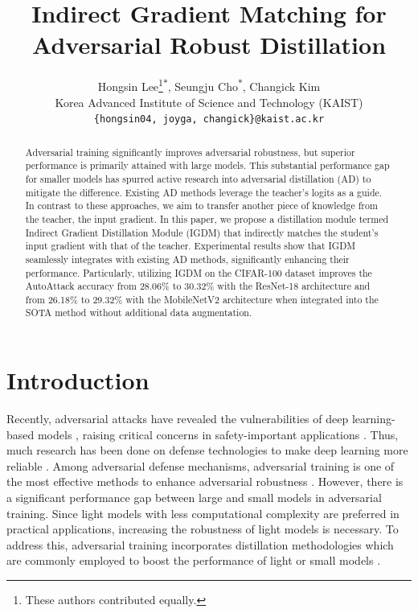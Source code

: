\documentclass{article} %
\title{Indirect Gradient Matching for Adversarial Robust Distillation}
\author{
Hongsin Lee\thanks{These authors contributed equally.}\textsuperscript{$*$}, 
Seungju Cho\footnotemark[1]\textsuperscript{$*$}, 
Changick Kim \\
Korea Advanced Institute of Science and Technology (KAIST)\\
{\normalsize \texttt{\{hongsin04, joyga, changick\}@kaist.ac.kr}} \\ 
}
\begin{document}
\maketitle

\begin{abstract}
Adversarial training significantly improves adversarial robustness, but superior performance is primarily attained with large models. 
This substantial performance gap for smaller models has spurred active research into adversarial distillation (AD) to mitigate the difference. 
Existing AD methods leverage the teacher’s logits as a guide.
In contrast to these approaches, we aim to transfer another piece of knowledge from the teacher, the input gradient.
In this paper, we propose a distillation module termed Indirect Gradient Distillation Module (IGDM) that indirectly matches the student’s input gradient with that of the teacher.
Experimental results show that IGDM seamlessly integrates with existing AD methods, significantly enhancing their performance.
Particularly, utilizing IGDM on the CIFAR-100 dataset improves the AutoAttack accuracy from 28.06\% to 30.32\% with the ResNet-18 architecture and from 26.18\% to 29.32\% with the MobileNetV2 architecture when integrated into the SOTA method without additional data augmentation.
\end{abstract}

\section{Introduction}
\label{sec:intro}

Recently, adversarial attacks have revealed the vulnerabilities of deep learning-based models \citep{FGSM, CW_attack, PGD}, raising critical concerns in safety-important applications \citep{safe2, safe1,wang2023does}.
Thus, much research has been done on defense technologies to make deep learning more reliable \citep{2017_jpeg_defense, carmon2019unlabeled, cohen2019certified, xie2019feature, zhang2022adversarial, jin2023randomized}.
Among adversarial defense mechanisms, adversarial training is one of the most effective methods to enhance adversarial robustness \citep{pang2020bag, bai2021recent, wei2023cfa}.
However, there is a significant performance gap between large and small models in adversarial training.
Since light models with less computational complexity are preferred in practical applications, increasing the robustness of light models is necessary.
To address this, adversarial training incorporates distillation methodologies which are commonly employed to boost the performance of light or small models \citep{ard,iad, rslad,adaad}.
\end{document}
